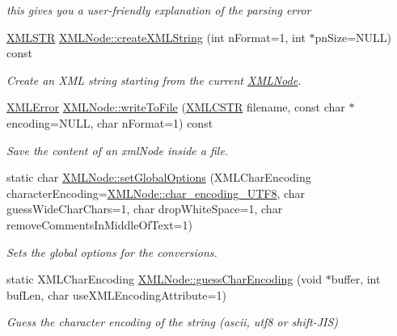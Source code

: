 \begin{DoxyCompactItemize}
\begin{DoxyCompactList}\small\item\em this gives you a user-\/friendly explanation of the parsing error \end{DoxyCompactList}\item 
\hyperlink{xmlParser_8h_a849d96105aa0c8f64b5c10d9151a3cdc}{X\-M\-L\-S\-T\-R} \hyperlink{group__conversions_gac8710ba5e7ff6e62a222445501ef9972}{X\-M\-L\-Node\-::create\-X\-M\-L\-String} (int n\-Format=1, int $\ast$pn\-Size=N\-U\-L\-L) const 
\begin{DoxyCompactList}\small\item\em Create an X\-M\-L string starting from the current \hyperlink{structXMLNode}{X\-M\-L\-Node}. \end{DoxyCompactList}\item 
\hyperlink{xmlParser_8h_ac39bd07b1461aaa70afffe2d7162b4f5}{X\-M\-L\-Error} \hyperlink{group__conversions_gab8d92d057c0072cc195b1935b2f53d80}{X\-M\-L\-Node\-::write\-To\-File} (\hyperlink{xmlParser_8h_acdb0d6fd8dd596384b438d86cfb2b182}{X\-M\-L\-C\-S\-T\-R} filename, const char $\ast$encoding=N\-U\-L\-L, char n\-Format=1) const 
\begin{DoxyCompactList}\small\item\em Save the content of an xml\-Node inside a file. \end{DoxyCompactList}\item 
static char \hyperlink{group__conversions_ga2e3943ac932bf3e786810234e7c295b9}{X\-M\-L\-Node\-::set\-Global\-Options} (X\-M\-L\-Char\-Encoding character\-Encoding=\hyperlink{structXMLNode_a81bcd09f9c752b65633c1ca28ea025f2a0b35b4d55aae2d232400578ab1123d5a}{X\-M\-L\-Node\-::char\-\_\-encoding\-\_\-\-U\-T\-F8}, char guess\-Wide\-Char\-Chars=1, char drop\-White\-Space=1, char remove\-Comments\-In\-Middle\-Of\-Text=1)
\begin{DoxyCompactList}\small\item\em Sets the global options for the conversions. \end{DoxyCompactList}\item 
static X\-M\-L\-Char\-Encoding \hyperlink{group__conversions_ga2fb8e9b250d669776e5e1962a70a4196}{X\-M\-L\-Node\-::guess\-Char\-Encoding} (void $\ast$buffer, int buf\-Len, char use\-X\-M\-L\-Encoding\-Attribute=1)
\begin{DoxyCompactList}\small\item\em Guess the character encoding of the string (ascii, utf8 or shift-\/\-J\-I\-S) \end{DoxyCompactList}\end{DoxyCompactItemize}


